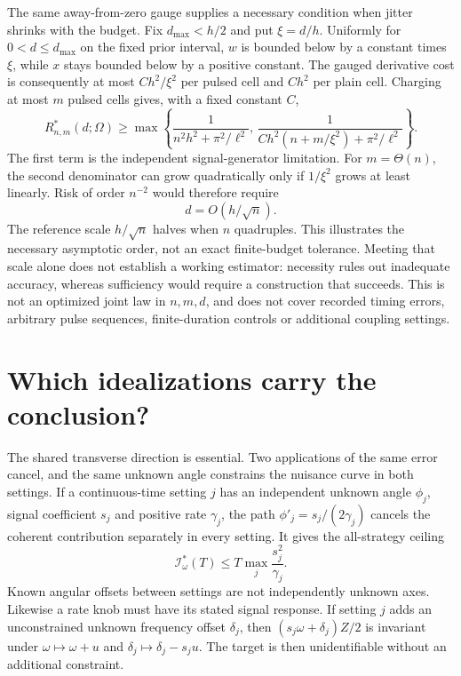 \documentclass[11pt,a4paper]{article}
\numberwithin{equation}{section}
\theoremstyle{remark}
\begin{document}
The same away-from-zero gauge supplies a necessary condition when jitter
shrinks with the budget. Fix $d_{\max}<h/2$ and put $\xi=d/h$. Uniformly for
$0<d\le d_{\max}$ on the fixed prior interval, $w$ is bounded below by a
constant times $\xi$, while $x$ stays bounded below by a positive constant.
The gauged derivative cost is consequently at most $C h^2/\xi^2$ per
pulsed cell and $C h^2$ per plain cell. Charging at most $m$ pulsed cells
gives, with a fixed constant $C$,
\begin{equation}
 R_{n,m}^{*}(d;\Omega)\ge
 \max\!\left\{
 \frac{1}{n^2h^2+\pi^2/\ell^2},\,
 \frac{1}{Ch^2(n+m/\xi^2)+\pi^2/\ell^2}
 \right\}.
\end{equation}
The first term is the independent signal-generator limitation. For
$m=\Theta(n)$, the second denominator can grow quadratically only if
$1/\xi^2$ grows at least linearly. Risk of order $n^{-2}$ would therefore require
\begin{equation}
 d=O(h/\sqrt n).
\end{equation}
The reference scale $h/\sqrt n$ halves when $n$ quadruples. This illustrates
the necessary asymptotic order, not an exact finite-budget tolerance.
Meeting that scale alone does not
establish a working estimator: necessity rules out inadequate accuracy,
whereas sufficiency would require a construction that succeeds.
This is not an optimized joint law
in $n,m,d$, and does not cover recorded timing errors, arbitrary pulse
sequences, finite-duration controls or additional coupling settings.

\section{Which idealizations carry the conclusion?}
\label{time:boundaries}

The shared transverse direction is essential. Two applications of the
same error cancel, and the same unknown angle constrains the nuisance
curve in both settings. If a continuous-time setting $j$ has an independent
unknown angle $\phi_j$, signal coefficient $s_j$ and positive rate
$\gamma_j$, the path $\phi'_j=s_j/(2\gamma_j)$ cancels the coherent
contribution separately in every setting. It gives the all-strategy ceiling
\begin{equation}
 \mathcal I_\omega^{*}(T)\le
 T\max_j\frac{s_j^2}{\gamma_j}.
\end{equation}
Known angular offsets between settings are not independently unknown axes.
Likewise a rate knob must have its stated signal response. If setting $j$
adds an unconstrained unknown frequency offset $\delta_j$, then
$(s_j\omega+\delta_j)Z/2$ is invariant under
$\omega\mapsto\omega+u$ and $\delta_j\mapsto\delta_j-s_ju$.
The target is then unidentifiable without an additional constraint.
\end{document}
